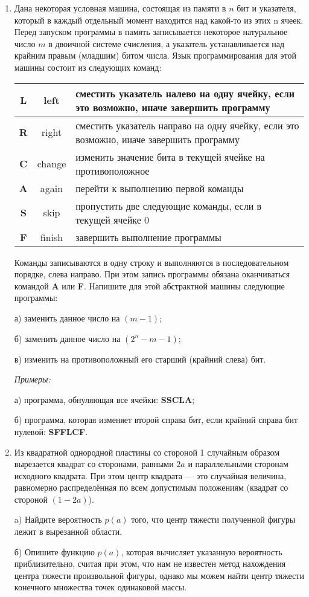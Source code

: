 \documentclass[12pt, a4paper]{article}
\begin{document}
\begin{enumerate}
\item  Дана некоторая условная машина, состоящая из памяти в $n$ бит и указателя, который в каждый отдельный момент находится над какой-то из этих n ячеек. Перед запуском программы в память записывается некоторое натуральное число $m$ в двоичной системе счисления, а указатель устанавливается над крайним правым (младшим) битом числа. Язык программирования для этой машины состоит из следующих команд:

\begin{center}
\begin{tabular}{|c|c|p{14cm}|}
\hline
{\bf L} & left & сместить указатель налево на одну ячейку, если это возможно, иначе завершить программу\\
\hline
{\bf R} & right & сместить указатель направо на одну ячейку, если это возможно, иначе завершить программу\\
\hline
{\bf C} & change & изменить значение бита в текущей ячейке на противоположное\\
\hline
{\bf A} & again & перейти к выполнению первой команды\\
\hline
{\bf S} & skip & пропустить две следующие команды, если в текущей ячейке 0\\
\hline
{\bf F} & finish & завершить выполнение программы\\
\hline
\end{tabular}
\end{center}

Команды записываются в одну строку и выполняются в последовательном порядке, слева направо. При этом запись программы обязана оканчиваться командой \textbf{A} или \textbf{F}. Напишите для этой абстрактной машины следующие программы:

а) заменить данное число на $(m - 1)$;

б) заменить данное число на $(2^n - m - 1)$;

в) изменить на противоположный его старший (крайний слева) бит.

\textit{Примеры:}

а) программа, обнуляющая все ячейки: \textbf{SSCLA};

б) программа, которая изменяет второй справа бит, если крайний справа бит нулевой: \textbf{SFFLCF}.


\item Из квадратной однородной пластины со стороной 1 случайным образом вырезается квадрат со сторонами, равными $2a$ и параллельными сторонам исходного квадрата. При этом центр квадрата --- это случайная величина, равномерно распределённая по всем допустимым положениям (квадрат со стороной $(1 - 2a)$).

a) Найдите вероятность $p(a)$ того, что центр тяжести полученной фигуры лежит в вырезанной области.

б) Опишите функцию $p(a)$, которая вычисляет указанную вероятность приблизительно, считая при этом, что нам не известен метод нахождения центра тяжести произвольной фигуры, однако мы можем найти центр тяжести конечного множества точек одинаковой массы.

\end{enumerate}
\end{document}
